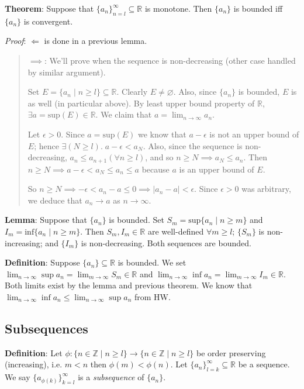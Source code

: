 \documentclass[11pt]{article}
\begin{document}
\textbf{Theorem}: Suppose that $\{a_n\}_{n=l}^\infty \subseteq \mathbb{R}$ is monotone. Then $\{a_n\}$ is bounded iff $\{a_n\}$ is convergent.

\emph{Proof}: $\Longleftarrow$ is done in a previous lemma.
\begin{quote}
$\implies$: We'll prove when the sequence is non-decreasing (other case handled by similar argument).

Set $E = \{a_n \;|\; n \geq l\} \subseteq \mathbb{R}$. Clearly $E \neq \varnothing$. Also, since $\{a_n\}$ is bounded, $E$ is as well (in particular above). By least upper bound property of $\mathbb{R}$, $\exists a = \text{sup}(E) \in \mathbb{R}$. We claim that $a = \lim_{n \to \infty} a_n$.

Let $\epsilon > 0$. Since $a = \text{sup}(E)$ we know that $a- \epsilon$ is not an upper bound of $E$; hence $\exists (N \geq l).\; a - \epsilon < a_N$. Also, since the sequence is non-decreasing, $a_n \leq a_{n+1} (\forall n \geq l)$, and so $n \geq N \implies a_N \leq a_n$. Then $n \geq N \implies a - \epsilon < a_N \leq a_n \leq a$ because $a$ is an upper bound of $E$.

So $n \geq N \implies -\epsilon < a_n - a \leq 0 \implies |a_n - a| < \epsilon$. Since $\epsilon > 0$ was arbitrary, we deduce that $a_n \to a$ as $n \to \infty$.
\end{quote}

\textbf{Lemma}: Suppose that $\{a_n\}$ is bounded. Set $S_m = \text{sup} \{a_n \;|\; n \geq m\}$ and $I_m = \text{inf} \{a_n \;|\; n \geq m\}$. Then $S_m, I_m \in \mathbb{R}$ are well-defined $\forall m \geq l$; $\{S_m\}$ is non-increasing; and $\{I_m\}$ is non-decreasing. Both sequences are bounded.

\textbf{Definition}: Suppose $\{a_n\} \subseteq \mathbb{R}$ is bounded. We set $\lim_{n \to \infty} \sup a_n = \lim_{m \to \infty} S_m \in \mathbb{R}$ and $\lim_{n \to \infty} \inf a_n = \lim_{m \to \infty} I_m \in \mathbb{R}$. Both limits exist by the lemma and previous theorem. We know that $\lim_{n \to \infty} \inf a_n \leq \lim_{n \to \infty} \sup a_n$ from HW.

\subsection{Subsequences}

\textbf{Definition}: Let $\phi: \{n \in \mathbb{Z} \;|\; n \geq l\} \to \{n \in \mathbb{Z}\;|\; n \geq l\}$ be order preserving (increasing), i.e. $m < n$ then $\phi(m) < \phi(n)$. Let $\{a_n\}_{l=k}^\infty \subseteq \mathbb{R}$ be a sequence. We say $\{a_{\phi(k)}\}_{k=l}^\infty$ is a \emph{subsequence} of $\{a_n\}$.
\end{document}
